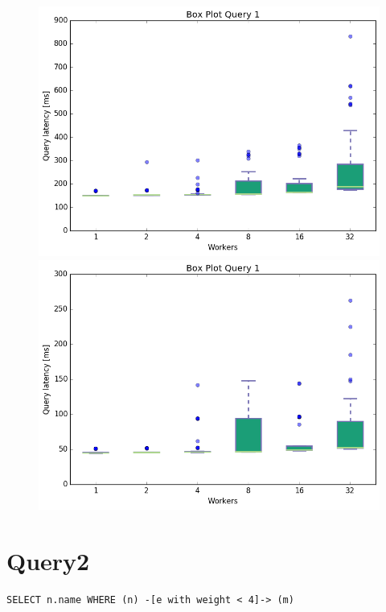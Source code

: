 \documentclass[11pt,singlecolumn]{scrartcl}
\begin{document}
\begin{figure}[!tbp]
  \centering
  \RawFloats
  \begin{minipage}[b]{0.5\textwidth}
    \includegraphics[width=\textwidth]{boxesjl/q1}
  \end{minipage}
  \hfill
  \begin{minipage}[b]{0.5\textwidth}
    \includegraphics[width=\textwidth]{boxesjs/q1}
  \end{minipage}
\end{figure}
\clearpage
\section{Query2}
\begin{verbatim}
SELECT n.name WHERE (n) -[e with weight < 4]-> (m)\end{verbatim}
\end{document}
